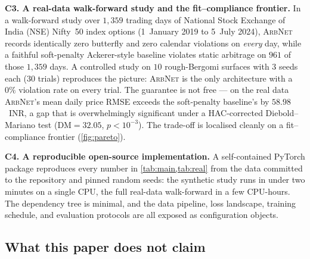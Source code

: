 \documentclass[largeformat]{interact}
\let\cite\citep   %
\theoremstyle{plain}
\theoremstyle{definition}
\newcommand{\arbnet}{\textsc{ArbNet}}
\begin{document}
\smallskip\noindent\textbf{C3. A real-data walk-forward study and the fit--compliance frontier.}
In a walk-forward study over $1{,}359$ trading days of National Stock Exchange of India (NSE) Nifty~50 index options (1~January 2019 to 5~July 2024), \arbnet{} records identically zero butterfly and zero calendar violations on \emph{every} day, while a faithful soft-penalty Ackerer-style baseline violates static arbitrage on $961$ of those $1{,}359$ days. A controlled study on $10$ rough-Bergomi surfaces with $3$ seeds each ($30$ trials) reproduces the picture: \arbnet{} is the only architecture with a $0\%$ violation rate on every trial. The guarantee is not free --- on the real data \arbnet{}'s mean daily price RMSE exceeds the soft-penalty baseline's by $58.98$~INR, a gap that is overwhelmingly significant under a HAC-corrected Diebold--Mariano test ($\mathrm{DM} = 32.05$, $p < 10^{-3}$). The trade-off is localised cleanly on a fit--compliance frontier (\cref{fig:pareto}).

\smallskip\noindent\textbf{C4. A reproducible open-source implementation.}
A self-contained PyTorch \cite{paszke2019pytorch} package reproduces every number in \cref{tab:main,tab:real} from the data committed to the repository and pinned random seeds: the synthetic study runs in under two minutes on a single CPU, the full real-data walk-forward in a few CPU-hours. The dependency tree is minimal, and the data pipeline, loss landscape, training schedule, and evaluation protocols are all exposed as configuration objects.

\subsection{What this paper does not claim}
\label{sec:framing}
\end{document}
